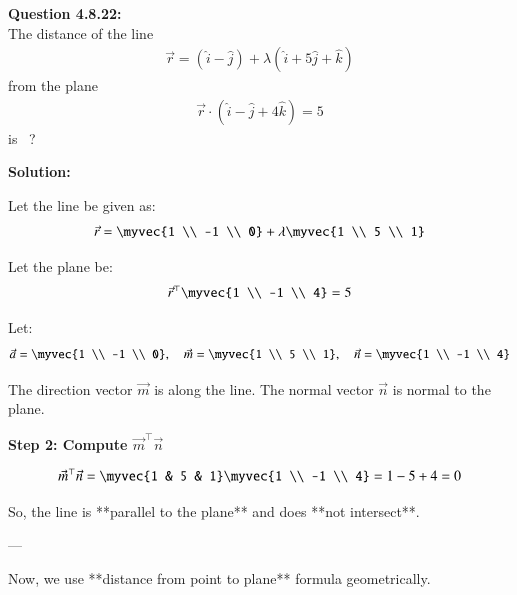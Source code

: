 \documentclass[journal]{IEEEtran}
\begin{document}



\textbf{Question 4.8.22:} \\
The distance of the line 
\begin{align}
\vec{r} = (\hat{i} - \hat{j}) + \lambda(\hat{i} + 5\hat{j} + \hat{k})
\end{align}
from the plane 
\begin{align}
\vec{r} \cdot (\hat{i} - \hat{j} + 4\hat{k}) = 5
\end{align}
is \, ?

\textbf{Solution:}

Let the line be given as:
\begin{align}
\vec{r} = \myvec{1 \\ -1 \\ 0} + \lambda \myvec{1 \\ 5 \\ 1} \label{1}
\end{align}

Let the plane be:
\begin{align}
\vec{r}^\top \myvec{1 \\ -1 \\ 4} = 5 \label{2}
\end{align}

Let:
\begin{align}
\vec{a} = \myvec{1 \\ -1 \\ 0}, \quad \vec{m} = \myvec{1 \\ 5 \\ 1}, \quad \vec{n} = \myvec{1 \\ -1 \\ 4} \label{3}
\end{align}

The direction vector \( \vec{m} \) is along the line.  
The normal vector \( \vec{n} \) is normal to the plane.

\textbf{Step 2: Compute \( \vec{m}^\top \vec{n} \)}

\begin{align}
\vec{m}^\top \vec{n} = \myvec{1 & 5 & 1} \myvec{1 \\ -1 \\ 4} = 1 - 5 + 4 = 0 \label{7}
\end{align}


So, the line is **parallel to the plane** and does **not intersect**.

---

Now, we use **distance from point to plane** formula geometrically.
\end{document}
